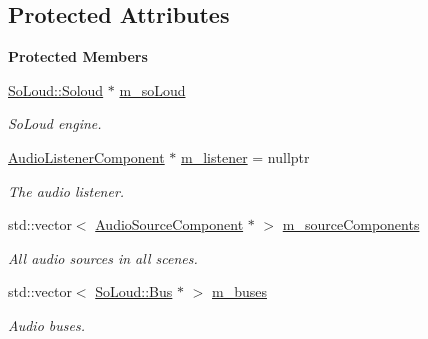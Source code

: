 \subsection*{Protected Attributes}
\begin{Indent}\textbf{ Protected Members}\par
\begin{DoxyCompactItemize}
\item 
\mbox{\label{classrev_1_1_sound_manager_a1681d7a23a41d5f1a9b5c71d1adf837e}} 
\mbox{\hyperlink{class_so_loud_1_1_soloud}{So\+Loud\+::\+Soloud}} $\ast$ \mbox{\hyperlink{classrev_1_1_sound_manager_a1681d7a23a41d5f1a9b5c71d1adf837e}{m\+\_\+so\+Loud}}
\begin{DoxyCompactList}\small\item\em So\+Loud engine. \end{DoxyCompactList}\item 
\mbox{\label{classrev_1_1_sound_manager_a87347a219cf1e089e88b560739eaeafa}} 
\mbox{\hyperlink{classrev_1_1_audio_listener_component}{Audio\+Listener\+Component}} $\ast$ \mbox{\hyperlink{classrev_1_1_sound_manager_a87347a219cf1e089e88b560739eaeafa}{m\+\_\+listener}} = nullptr
\begin{DoxyCompactList}\small\item\em The audio listener. \end{DoxyCompactList}\item 
\mbox{\label{classrev_1_1_sound_manager_a8fe1c3da866a506bd284aa31dec9b206}} 
std\+::vector$<$ \mbox{\hyperlink{classrev_1_1_audio_source_component}{Audio\+Source\+Component}} $\ast$ $>$ \mbox{\hyperlink{classrev_1_1_sound_manager_a8fe1c3da866a506bd284aa31dec9b206}{m\+\_\+source\+Components}}
\begin{DoxyCompactList}\small\item\em All audio sources in all scenes. \end{DoxyCompactList}\item 
\mbox{\label{classrev_1_1_sound_manager_a2ee975dbd48f9a67eeadd93e47643ad4}} 
std\+::vector$<$ \mbox{\hyperlink{class_so_loud_1_1_bus}{So\+Loud\+::\+Bus}} $\ast$ $>$ \mbox{\hyperlink{classrev_1_1_sound_manager_a2ee975dbd48f9a67eeadd93e47643ad4}{m\+\_\+buses}}
\begin{DoxyCompactList}\small\item\em Audio buses. \end{DoxyCompactList}\item 

\end{DoxyCompactItemize}
\end{Indent}
